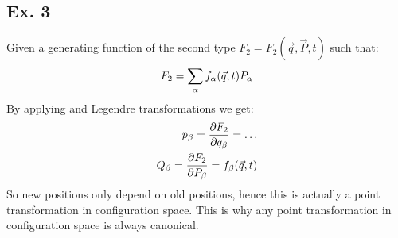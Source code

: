 \subsection{Ex. 3}
Given a generating function of the second type $F_2 = F_2(\vec{q},\vec{P},t)$ such that:
\begin{equation}
    F_2 = \displaystyle\sum_{\alpha} f_{\alpha}(\vec{q},t) P_{\alpha}
\end{equation}
By applying \hamiltonref\;and Legendre transformations we get:
\begin{equation}
    \begin{split}
        p_{\beta} = \pdv{F_2}{q_{\beta}} = \dots\\
        Q_{\beta} = \pdv{F_2}{P_{\beta}} = f_{\beta}(\vec{q},t)
    \end{split}
\end{equation}
So new positions only depend on old positions, hence this is actually a point transformation in configuration space. This is why any point transformation in configuration space is always canonical.
